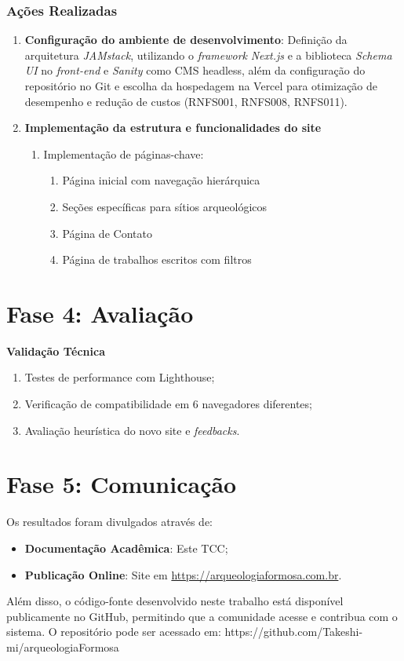 \subsubsection*{Ações Realizadas}
\begin{enumerate}
\item \textbf{Configuração do ambiente de desenvolvimento}: Definição da arquitetura \textit{JAMstack}, utilizando o \textit{framework} \textit{Next.js} e a biblioteca \textit{Schema UI} no \textit{front-end} e \textit{Sanity} como CMS headless, além da configuração do repositório no Git e escolha da hospedagem na Vercel para otimização de desempenho e redução de custos (RNFS001, RNFS008, RNFS011).

    
    \item \textbf{Implementação da estrutura e funcionalidades do site}
    \begin{enumerate}
        \item Implementação de páginas-chave:
        \begin{enumerate}
            \item Página inicial com navegação hierárquica
            \item Seções específicas para sítios arqueológicos
            \item Página de Contato
            \item Página de trabalhos escritos com filtros
        \end{enumerate}
    \end{enumerate}
    
\end{enumerate}

\section{Fase 4: Avaliação} \label{sec:avaliacao-dsr}

    \textbf{Validação Técnica}
    \begin{enumerate}
        \item Testes de performance com Lighthouse;
        \item Verificação de compatibilidade em 6 navegadores diferentes;
        \item Avaliação heurística do novo site e \textit{feedbacks}.
    \end{enumerate}
    

\section{Fase 5: Comunicação} \label{sec:comunicacao-dsr}

Os resultados foram divulgados através de:
\begin{itemize}
    \item \textbf{Documentação Acadêmica}: Este TCC;
    \item \textbf{Publicação Online}: Site em \url{https://arqueologiaformosa.com.br}.
\end{itemize}

Além disso, o código-fonte desenvolvido neste trabalho está disponível publicamente no GitHub, permitindo que a comunidade acesse e contribua com o sistema. O repositório pode ser acessado em: https://github.com/Takeshi-mi/arqueologiaFormosa